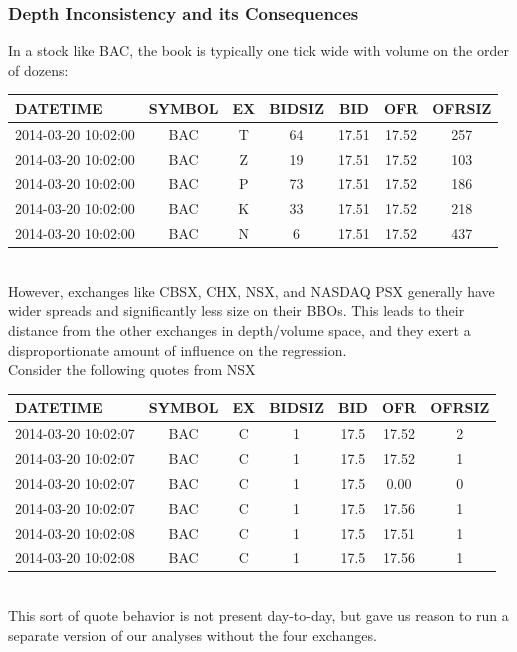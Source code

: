 \documentclass{article}
\begin{document}
\subsubsection{Depth Inconsistency and its Consequences}
In a stock like BAC, the book is typically one tick wide with volume on the order of dozens:\\
\begin{tabular}{ | l | c | c | c | c | c | c |}
\hline
DATETIME & SYMBOL & EX & BIDSIZ  & BID   & OFR & OFRSIZ \\ \hline 
2014-03-20 10:02:00   & BAC & T  &   64& 17.51& 17.52&    257         \\ \hline 
2014-03-20 10:02:00   & BAC & Z  &   19 &17.51& 17.52&    103         \\ \hline 
2014-03-20 10:02:00   & BAC & P  &   73 &17.51& 17.52&    186         \\ \hline 
2014-03-20 10:02:00   & BAC & K  &   33 &17.51& 17.52&    218         \\ \hline 
2014-03-20 10:02:00   & BAC & N  &    6 &17.51 &17.52&    437         \\ \hline 
\end{tabular}\\

However, exchanges like CBSX, CHX, NSX, and NASDAQ PSX generally have wider spreads and significantly less size on their BBOs. This leads to their distance from the other exchanges in depth/volume space, and they exert a disproportionate amount of influence on the regression.\\

Consider the following quotes from NSX\\

\begin{tabular}{ | l | c | c | c | c | c | c |}
\hline
DATETIME & SYMBOL & EX & BIDSIZ  & BID   & OFR & OFRSIZ \\ \hline 
2014-03-20 10:02:07  &   BAC &  C  &     1 & 17.5 & 17.52  &     2     \\ \hline 
2014-03-20 10:02:07  &   BAC &  C  &     1 & 17.5 & 17.52  &     1        \\ \hline 
2014-03-20 10:02:07  &   BAC &  C  &     1 & 17.5 &  0.00   &    0         \\ \hline 
2014-03-20 10:02:07  &   BAC &  C  &     1 & 17.5 & 17.56  &     1         \\ \hline 
2014-03-20 10:02:08  &   BAC &  C  &     1 & 17.5 & 17.51  &     1         \\ \hline 
2014-03-20 10:02:08  &   BAC &  C  &     1 & 17.5 & 17.56  &     1 \\ \hline 
\end{tabular}\\

This sort of quote behavior is not present day-to-day, but gave us reason to run a separate version of our analyses without the four exchanges.\\
\end{document}
